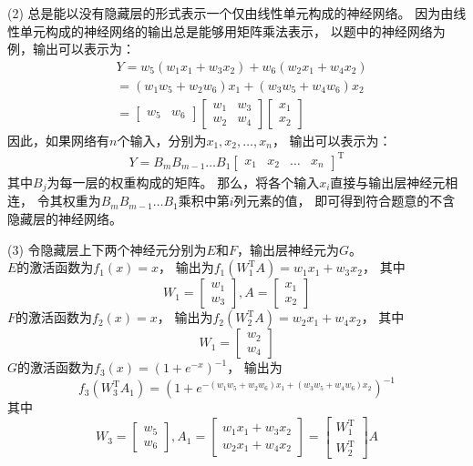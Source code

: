 \documentclass{article}
\begin{document}
	\noindent (2) 
	总是能以没有隐藏层的形式表示一个仅由线性单元构成的神经网络。
	因为由线性单元构成的神经网络的输出总是能够用矩阵乘法表示，
	以题中的神经网络为例，输出可以表示为：
	\begin{align*}
		& Y=w_5(w_1x_1+w_3x_2)+w_6(w_2x_1+w_4x_2) \\
		& =(w_1w_5+w_2w_6)x_1+(w_3w_5+w_4w_6)x_2 \\
		& =\left[
			\begin{matrix}
				w_5 & w_6
			\end{matrix}
			\right] 
			\left[
			\begin{matrix}
				w_1 & w_3 \\
				w_2 & w_4
			\end{matrix}
			\right]
			\left[
			\begin{matrix}
				x_1 \\
				x_2
			\end{matrix}
			\right]
	\end{align*}
	因此，如果网络有$n$个输入，分别为$x_1,x_2,\dots ,x_n$，
	输出可以表示为：
	\begin{align*}
		Y=B_mB_{m-1}\dots B_1
		\left[
		\begin{matrix}
			x_1 & x_2 & \dots & x_n
		\end{matrix}
		\right]^{\mathrm{T}}
	\end{align*}
	其中$B_j$为每一层的权重构成的矩阵。
	那么，将各个输入$x_i$直接与输出层神经元相连，
	令其权重为$B_mB_{m-1}\dots B_1$乘积中第$i$列元素的值，
	即可得到符合题意的不含隐藏层的神经网络。

	\noindent (3) 
	令隐藏层上下两个神经元分别为$E$和$F$，输出层神经元为$G$。\\
	$E$的激活函数为$f_1(x)=x$，
	输出为$f_1(W_1^{\mathrm{T}}A)=w_1x_1+w_3x_2$，
	其中
	$$
		W_1=\left[
		\begin{matrix}
			w_1 \\
			w_3
		\end{matrix}	
		\right], 
		A=\left[
		\begin{matrix}
			x_1 \\
			x_2
		\end{matrix}	
		\right]
	$$
	$F$的激活函数为$f_2(x)=x$，
	输出为$f_2(W_2^{\mathrm{T}}A)=w_2x_1+w_4x_2$，
	其中
	$$
		W_1=\left[
		\begin{matrix}
			w_2 \\
			w_4
		\end{matrix}	
		\right]
	$$
	$G$的激活函数为$f_3(x)=(1+e^{-x})^{-1}$，
	输出为
	$$
	f_3(W_3^{\mathrm{T}}A_1)=(1+e^{-(w_1w_5+w_2w_6)x_1+(w_3w_5+w_4w_6)x_2})^{-1}
	$$
	其中
	$$
		W_3=\left[
		\begin{matrix}
			w_5 \\
			w_6
		\end{matrix}	
		\right], 
		A_1=\left[
		\begin{matrix}
			w_1x_1+w_3x_2 \\
			w_2x_1+w_4x_2
		\end{matrix}	
		\right]
		=\left[
		\begin{matrix}
			W_1^{\mathrm{T}} \\
			W_2^{\mathrm{T}}
		\end{matrix}	
		\right]A
	$$
\end{document}
